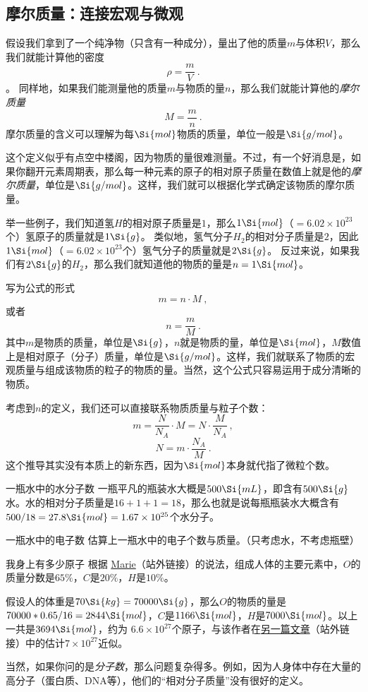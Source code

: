 \subsection{摩尔质量：连接宏观与微观}
假设我们拿到了一个纯净物（只含有一种成分），量出了他的质量$m$与体积$V$，那么我们就能计算他的密度
$$\rho = \frac{m}{V}~.$$。
同样地，如果我们能测量他的质量$m$与物质的量$n$，那么我们就能计算他的\textsl{摩尔质量}
$$M = \frac{m}{n}~.$$
摩尔质量的含义可以理解为每$\Si{mol}$物质的质量，单位一般是$\Si{g/mol}$。

这个定义似乎有点空中楼阁，因为物质的量很难测量。不过，有一个好消息是，如果你翻开元素周期表，那么每一种元素的原子的相对原子质量在数值上就是他的\textsl{摩尔质量}，单位是$\Si{g/mol}$。这样，我们就可以根据化学式确定该物质的摩尔质量。

举一些例子，我们知道氢$H$的相对原子质量是$1$，那么$1 \Si{mol}$（$=6.02\times 10^{23}$个）氢原子的质量就是$1 \Si{g}$。
类似地，氢气分子$H_2$的相对分子质量是$2$，因此$1 \Si{mol}$（$=6.02\times 10^{23}$个）氢气分子的质量就是$2 \Si{g}$。
反过来说，如果我们有$2 \Si{g}$的$H_2$，那么我们就知道他的物质的量是$n=1 \Si{mol}$。

写为公式的形式
$$m = n \cdot M~,$$
或者
$$n = \frac{m}{M}~.$$
其中$m$是物质的质量，单位是$\Si{g}$，$n$就是物质的量，单位是$\Si{mol}$，$M$数值上是相对原子（分子）质量，单位是$\Si{g/mol}$。这样，我们就联系了物质的宏观质量与组成该物质的粒子的物质的量。当然，这个公式只容易运用于成分清晰的物质。

考虑到$n$的定义，我们还可以直接联系物质质量与粒子个数：
$$m = \frac{N}{N_A} \cdot M = N \cdot \frac{M}{N_A}~,$$
$$N = m \cdot \frac{N_A}{M}~.$$
这个推导其实没有本质上的新东西，因为$\Si{mol}$本身就代指了微粒个数。

\begin{example}{一瓶水中的水分子数}
一瓶平凡的瓶装水大概是$500 \Si{mL}$，即含有$500 \Si{g}$水。水的相对分子质量是$16+1+1=18$，那么也就是说每瓶瓶装水大概含有$500/18=27.8 \Si{mol} = 1.67 \times 10^{25}$个水分子。
\end{example}

\begin{exercise}{一瓶水中的电子数}
估算上一瓶水中的电子个数与质量。（只考虑水，不考虑瓶壁）
\end{exercise}

\begin{example}{我身上有多少原子}
根据 \href{https://www.thoughtco.com/elemental-composition-of-human-body-603896}{Marie}（站外链接）的说法，组成人体的主要元素中，$O$的质量分数是$65\%$，$C$是$20\%$，$H$是$10\%$。

假设人的体重是$70 \Si{kg} = 70 000\Si{g}$，那么$O$的物质的量是$70000*0.65/16 = 2844 \Si{mol}$，$C$是$ 1166 \Si{mol}$，$H$是$ 7000 \Si{mol}$。以上一共是$3694 \Si{mol}$，约为 $6.6\times10^{27}$个原子，与该作者在\href{https://www.thoughtco.com/how-many-atoms-are-in-human-body-603872}{另一篇文章}（站外链接）中的估计$7\times10^{27}$近似。

当然，如果你问的是\textsl{分子数}，那么问题复杂得多。例如，因为人身体中存在大量的高分子（蛋白质、DNA等），他们的“相对分子质量”没有很好的定义。
\end{example}

